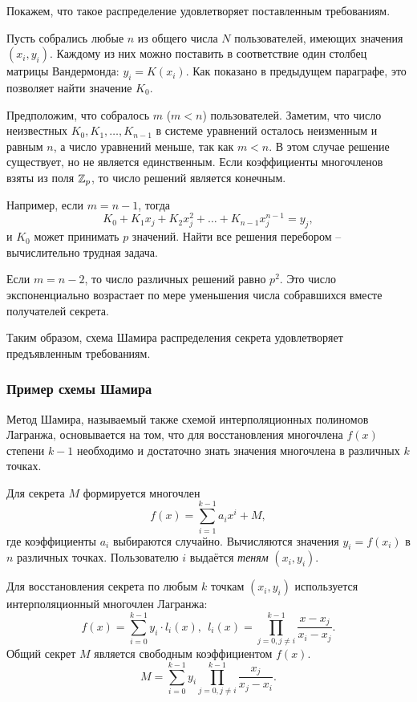 Покажем, что такое распределение удовлетворяет поставленным требованиям.

Пусть собрались любые $n$ из общего числа $N$ пользователей, имеющих значения $(x_i, y_i)$. Каждому из них можно поставить в соответствие один столбец матрицы Вандермонда: $y_i = K(x_i)$. Как показано в предыдущем параграфе, это позволяет найти значение $K_0$.

Предположим, что собралось $m$ ($m<n$) пользователей. Заметим, что число неизвестных $K_0, K_1, \dots, K_{n-1}$ в системе уравнений осталось неизменным и равным $n$, а число уравнений меньше, так как $m<n$. В этом случае решение существует, но не является единственным. Если коэффициенты многочленов взяты из поля $\mathbb{Z}_p$, то число решений является конечным.

Например, если $m = n - 1$, тогда
    \[ K_0 + K_1 x_j + K_2 x_j^2 + \dots + K_{n-1} x_j^{n-1} = y_j, \]
и $K_0$ может принимать $p$ значений. Найти все решения перебором -- вычислительно трудная задача.

Если $m = n - 2$, то число различных решений равно $p^2$. Это число экспоненциально возрастает по мере уменьшения числа собравшихся вместе получателей секрета.

Таким образом, схема Шамира распределения секрета удовлетворяет предъявленным требованиям.

\subsubsection{Пример схемы Шамира}

Метод Шамира, называемый также схемой интерполяционных полиномов Лагранжа, основывается на том, что для восстановления многочлена $f(x)$ степени $k-1$ необходимо и достаточно знать значения многочлена в различных $k$ точках.

Для секрета $M$ формируется многочлен
    \[ f(x) = \sum\limits_{i=1}^{k-1} a_i x^i + M, \]
где коэффициенты $a_i$ выбираются случайно. Вычисляются значения $y_i = f(x_i)$ в $n$ различных точках. Пользователю $i$ выдаётся \emph{теням} $(x_i, y_i)$.

Для восстановления секрета по любым $k$ точкам $(x_i, y_i)$ используется интерполяционный многочлен Лагранжа:
    \[ f(x) = \sum\limits_{i=0}^{k-1} y_i \cdot l_i(x), ~~ l_i(x) = \prod\limits_{j=0, j \neq i}^{k-1} \frac{x - x_j}{x_i - x_j}. \]
Общий секрет $M$ является свободным коэффициентом $f(x)$.
    \[ M = \sum\limits_{i=0}^{k-1} y_i \prod\limits_{j=0, j \neq i}^{k-1} \frac{x_j}{x_j - x_i}. \]

